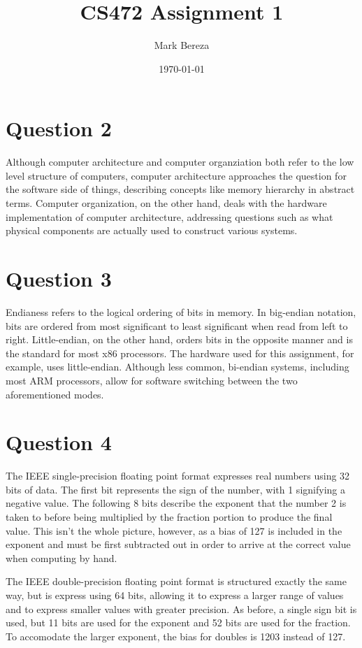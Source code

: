 \documentclass[12pt]{article}%
\begin{document}
\title{CS472 Assignment 1}
\author{Mark Bereza}
\date{\today}
\maketitle
\section{Question 2}
Although computer architecture and computer organziation both refer to the low level structure of computers, computer architecture approaches the question for the software side of things, describing concepts like memory hierarchy in abstract terms. Computer organization, on the other hand, deals with the hardware implementation of computer architecture, addressing questions such as what physical components are actually used to construct various systems.
\section{Question 3}
Endianess refers to the logical ordering of bits in memory. In big-endian notation, bits are ordered from most significant to least significant when read from left to right. Little-endian, on the other hand, orders bits in the opposite manner and is the standard for most x86 processors. The hardware used for this assignment, for example, uses little-endian. Although less common, bi-endian systems, including most ARM processors, allow for software switching between the two aforementioned modes.
\section{Question 4}
The IEEE single-precision floating point format expresses real numbers using 32 bits of data. The first bit represents the sign of the number, with 1 signifying a negative value. The following 8 bits describe the exponent that the number 2 is taken to before being multiplied by the fraction portion to produce the final value. This isn't the whole picture, however, as a bias of 127 is included in the exponent and must be first subtracted out in order to arrive at the correct value when computing by hand.

The IEEE double-precision floating point format is structured exactly the same way, but is express using 64 bits, allowing it to express a larger range of values and to express smaller values with greater precision. As before, a single sign bit is used, but 11 bits are used for the exponent and 52 bits are used for the fraction. To accomodate the larger exponent, the bias for doubles is 1203 instead of 127. 
\end{document}
